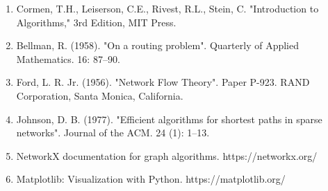 \documentclass[11pt]{article}
\begin{document}
\begin{enumerate}
    \item Cormen, T.H., Leiserson, C.E., Rivest, R.L., Stein, C. "Introduction to Algorithms," 3rd Edition, MIT Press.
    
    \item Bellman, R. (1958). "On a routing problem". Quarterly of Applied Mathematics. 16: 87–90.
    
    \item Ford, L. R. Jr. (1956). "Network Flow Theory". Paper P-923. RAND Corporation, Santa Monica, California.
    
    \item Johnson, D. B. (1977). "Efficient algorithms for shortest paths in sparse networks". Journal of the ACM. 24 (1): 1–13.
    
    \item NetworkX documentation for graph algorithms. https://networkx.org/
    
    \item Matplotlib: Visualization with Python. https://matplotlib.org/
\end{enumerate}
\end{document}
